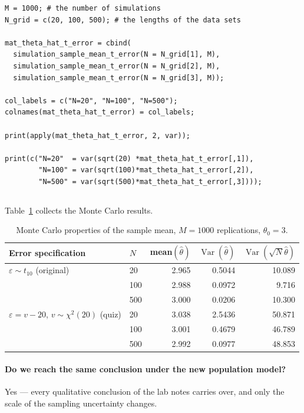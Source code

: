 \documentclass[11pt]{article}
\newcommand{\code}[1]{\texttt{#1}}
\begin{document}
\begin{lstlisting}[style=Rcode,caption={Collecting the results, one matrix per
error distribution (excerpt from
\code{R/q2\_monte\_carlo.R}).},label={lst:q2-collect}]
M = 1000; # the number of simulations
N_grid = c(20, 100, 500); # the lengths of the data sets

mat_theta_hat_t_error = cbind(
  simulation_sample_mean_t_error(N = N_grid[1], M),
  simulation_sample_mean_t_error(N = N_grid[2], M),
  simulation_sample_mean_t_error(N = N_grid[3], M));

col_labels = c("N=20", "N=100", "N=500");
colnames(mat_theta_hat_t_error) = col_labels;

print(apply(mat_theta_hat_t_error, 2, var));

print(c("N=20"  = var(sqrt(20) *mat_theta_hat_t_error[,1]),
        "N=100" = var(sqrt(100)*mat_theta_hat_t_error[,2]),
        "N=500" = var(sqrt(500)*mat_theta_hat_t_error[,3])));
\end{lstlisting}

\subsection{}

Table~\ref{tab:q2} collects the Monte Carlo results.

\begin{table}[htbp]
\centering
\caption{Monte Carlo properties of the sample mean, $M = 1000$ replications,
$\theta_0 = 3$.}
\label{tab:q2}
\small
\begin{tabular}{llrrr}
\toprule
Error specification & $N$ & mean$(\hat\theta)$ &
$\operatorname{Var}(\hat\theta)$ &
$\operatorname{Var}(\sqrt{N}\hat\theta)$ \\
\midrule
$\varepsilon \sim t_{10}$ (original)
  & 20  & 2.965 & 0.5044 & 10.089 \\
  & 100 & 2.988 & 0.0972 &  9.716 \\
  & 500 & 3.000 & 0.0206 & 10.300 \\
\addlinespace
$\varepsilon = v - 20$, $v \sim \chi^2(20)$ (quiz)
  & 20  & 3.038 & 2.5436 & 50.871 \\
  & 100 & 3.001 & 0.4679 & 46.789 \\
  & 500 & 2.992 & 0.0977 & 48.853 \\
\bottomrule
\end{tabular}
\end{table}

\paragraph{Do we reach the same conclusion under the new population model?}
Yes --- every qualitative conclusion of the lab notes carries over, and only the
scale of the sampling uncertainty changes.
\end{document}
